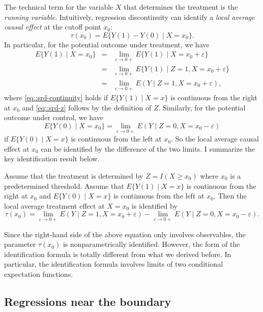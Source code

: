 The technical term for the variable $X$ that determines the treatment is the {\it running variable}. 
Intuitively, regression discontinuity can identify a {\it local average causal effect} at the cutoff point $x_0$: 
$$
\tau(x_0) = E\{ Y(1) - Y(0)  \mid X=x_0 \}. 
$$
In particular, for the potential outcome under treatment, we have
\begin{eqnarray}
E\{ Y(1) \mid X=x_0 \} &=& \lim_{\varepsilon \rightarrow 0+ } E\{ Y(1) \mid X=x_0+\varepsilon \} \label{eq::srd-continuity} \\
&=& \lim_{\varepsilon \rightarrow 0+} E\{ Y(1) \mid Z=1, X=x_0+\varepsilon \}  \label{eq::srd-z} \\
&=&  \lim_{\varepsilon \rightarrow 0+} E( Y \mid Z=1, X=x_0+\varepsilon ),
\end{eqnarray} 
where \eqref{eq::srd-continuity} holds if $ E\{ Y(1) \mid X=x\}$ is continuous from the right at $x_0$ and \eqref{eq::srd-z} follows by the definition of $Z$. Similarly, for the potential outcome under control, we have
$$
E\{ Y(0) \mid X=x_0 \} =  \lim_{\varepsilon \rightarrow 0+} E( Y \mid Z=0, X=x_0-\varepsilon )
$$
if $ E\{ Y(0) \mid X=x\}$ is continuous from the left at $x_0$. 
So the local average causal effect at $x_0$ can be identified by the difference of the two limits. I summarize the key identification result below.


\begin{theorem}
\label{thm::identification-rdd}
Assume that the treatment is determined by  $Z = I(X \geq x_0)$
where $x_0$ is a predetermined threshold. 
Assume that $ E\{ Y(1) \mid X=x\}$ is continuous from the right at $x_0$ and $ E\{ Y(0) \mid X=x\}$ is continuous from the left at $x_0$. Then the local average treatment effect at $X=x_0$ is identified by
$$
\tau(x_0) = \lim_{\varepsilon \rightarrow 0+} E( Y \mid Z=1, X=x_0+\varepsilon ) - \lim_{\varepsilon \rightarrow 0+} E( Y \mid Z=0, X=x_0-\varepsilon ).
$$
\end{theorem}

Since the right-hand side of the above equation only involves observables, the parameter $\tau(x_0)$ is nonparametrically identified. However, the form of the identification formula is totally different from what we derived before. In particular, the identification formula involves limits of two conditional expectation functions. 



\subsection{Regressions near the boundary}\label{sec::rdd-numerical}

